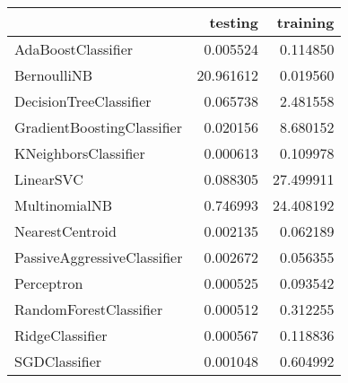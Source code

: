\begin{tabular}{lrr}
\toprule
{} &    testing &   training \\
\midrule
AdaBoostClassifier          &   0.005524 &   0.114850 \\
BernoulliNB                 &  20.961612 &   0.019560 \\
DecisionTreeClassifier      &   0.065738 &   2.481558 \\
GradientBoostingClassifier  &   0.020156 &   8.680152 \\
KNeighborsClassifier        &   0.000613 &   0.109978 \\
LinearSVC                   &   0.088305 &  27.499911 \\
MultinomialNB               &   0.746993 &  24.408192 \\
NearestCentroid             &   0.002135 &   0.062189 \\
PassiveAggressiveClassifier &   0.002672 &   0.056355 \\
Perceptron                  &   0.000525 &   0.093542 \\
RandomForestClassifier      &   0.000512 &   0.312255 \\
RidgeClassifier             &   0.000567 &   0.118836 \\
SGDClassifier               &   0.001048 &   0.604992 \\
\bottomrule
\end{tabular}
